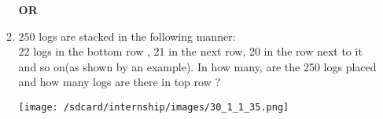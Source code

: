\documentclass[12pt]{article}
\begin{document}
\begin{enumerate}
\begin{enumerate}[label=(\Alph*)]
\begin{center}
            \textbf{OR}
        \end{center}
        \item $250$ logs are stacked in the following manner:\\
        22 logs in the bottom row , 21 in the next row, 20 in the row next to it and so on(as shown by an example). In how many, are the 250 logs placed and how many logs are there in top row ?
         \begin{center}
\texttt{[image: /sdcard/internship/images/30\_1\_1\_35.png]}
     \end{center}
    \end{enumerate}
\end{enumerate}
\end{document}
